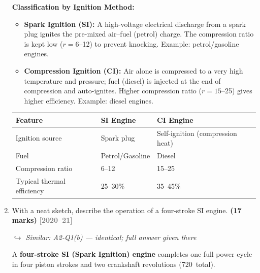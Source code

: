 \documentclass[12pt,a3paper]{article}
\newcommand{\yr}[1]{\hfill\textcolor{gray}{\small\textbf{[#1]}}}
\newcommand{\mk}[1]{\textcolor{orange!70!black}{\small\textbf{(#1 marks)}}}
\newcommand{\variant}[1]{\par\vspace{1pt}\textcolor{blue!50!black}%
  {\footnotesize\textit{$\hookrightarrow$ Similar: #1}}}
\begin{document}
\begin{enumerate}
\begin{tcolorbox}[enhanced,breakable,ansbox,colback=cB!4,colframe=cB,
  boxrule=0.8pt,arc=5pt,
  title={\textbf{Answer}},fonttitle=\bfseries\color{white},colbacktitle=cB]
\textbf{Classification by Ignition Method:}

\begin{itemize}[leftmargin=1.5em,itemsep=3pt]
  \item \textbf{Spark Ignition (SI):} A high-voltage electrical discharge from a
        spark plug ignites the pre-mixed air--fuel (petrol) charge. The
        compression ratio is kept low ($r = 6$--12) to prevent knocking.
        Example: petrol/gasoline engines.
  \item \textbf{Compression Ignition (CI):} Air alone is compressed to a very
        high temperature and pressure; fuel (diesel) is injected at the end of
        compression and auto-ignites. Higher compression ratio ($r = 15$--25)
        gives higher efficiency. Example: diesel engines.
\end{itemize}

\begin{center}
\small
\begin{tabular}{@{}lll@{}}
\toprule
\textbf{Feature}              & \textbf{SI Engine}        & \textbf{CI Engine} \\
\midrule
Ignition source               & Spark plug                & Self-ignition (compression heat) \\
Fuel                          & Petrol/Gasoline           & Diesel \\
Compression ratio             & 6--12                     & 15--25 \\
Typical thermal efficiency    & 25--30\%                  & 35--45\% \\
\bottomrule
\end{tabular}
\end{center}

\end{tcolorbox}

\item \label{qlabel:A2-Q6}
With a neat sketch, describe the operation of a four-stroke SI engine. \mk{17}
\yr{2020--21}

\begin{tcolorbox}[enhanced,breakable,ansbox,colback=cB!4,colframe=cB,
  boxrule=0.8pt,arc=5pt,
  title={\textbf{Answer}},fonttitle=\bfseries\color{white},colbacktitle=cB]

\variant{A2-Q1(b) — identical; full answer given there}

A \textbf{four-stroke SI (Spark Ignition) engine} completes one full power cycle
in four piston strokes and two crankshaft revolutions (720\textdegree\ total).


\end{tcolorbox}
\end{enumerate}
\end{document}
